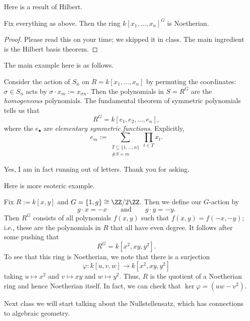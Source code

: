 Here is a result of Hilbert.
\begin{theorem}[Hilbert]
	Fix everything as above. Then the ring $k[x_1,\ldots,x_n]^G$ is Noetherian.
\end{theorem}
\begin{proof}
	Please read this on your time; we skipped it in class. The main ingredient is the Hilbert basis theorem.
\end{proof}
The main example here is as follows.
\begin{example}
	Consider the action of $S_n$ on $R=k[x_1,\ldots,x_n]$ by permuting the coordinates: $\sigma\in S_n$ acts by $\sigma\cdot x_m:=x_{\sigma n}$. Then the polynomials in $S=R^G$ are the \textit{homogeneous} polynomials. The fundamental theorem of symmetric polynomials tells us that
	\[R^G=k[e_1,e_2,\ldots,e_n],\]
	where the $e_\bullet$ are \textit{elementary symmetric functions}. Explicitly,
	\[e_m:=\sum_{\substack{T\subseteq\{1,\ldots,n\}\\\#S=m}}\prod_{t\in T}x_t.\]
\end{example}
\begin{remark}
	Yes, I am in fact running out of letters. Thank you for asking.
\end{remark}
Here is more esoteric example.
\begin{example}
	Fix $R:=k[x,y]$ and $G=\{1,g\}\cong\ZZ/2\ZZ$. Then we define our $G$-action by
	\[g\cdot x=-x\qquad\text{and}\qquad g\cdot y=-y.\]
	Then $R^G$ consists of all polynomials $f(x,y)$ such that $f(x,y)=f(-x,-y)$; i.e., these are the polynomials in $R$ that all have even degree. It follows after some pushing that
	\[R^G=k\left[x^2,xy,y^2\right].\]
	To see that this ring is Noetherian, we note that there is a surjection
	\[\varphi:k[u,v,w]\to k\left[x^2,xy,y^2\right]\]
	taking $u\mapsto x^2$ and $v\mapsto xy$ and $w\mapsto y^2$. Thus, $R$ is the quotient of a Noetherian ring and hence Noetherian itself. In fact, we can check that $\ker\varphi=\left(uw-v^2\right)$.
\end{example}
Next class we will start talking about the Nullstellensatz, which has connections to algebraic geometry.